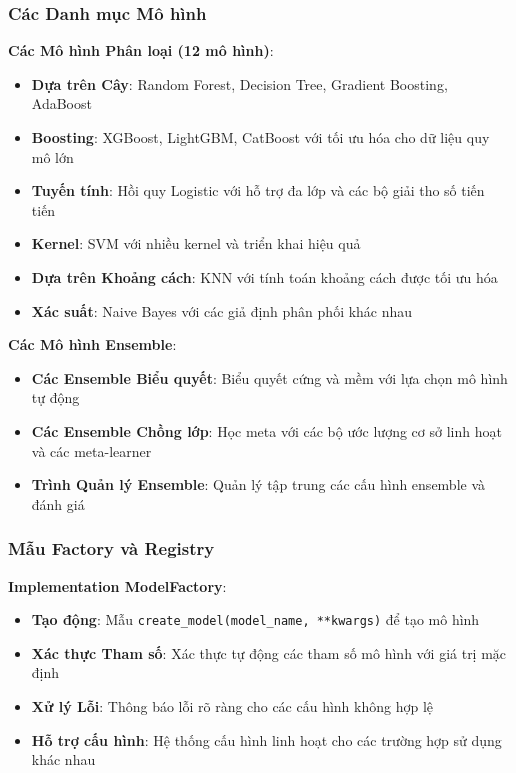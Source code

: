 \subsubsection{Các Danh mục Mô hình}

\textbf{Các Mô hình Phân loại (12 mô hình)}:
\begin{itemize}
    \item \textbf{Dựa trên Cây}: Random Forest, Decision Tree, Gradient Boosting, AdaBoost
    \item \textbf{Boosting}: XGBoost, LightGBM, CatBoost với tối ưu hóa cho dữ liệu quy mô lớn
    \item \textbf{Tuyến tính}: Hồi quy Logistic với hỗ trợ đa lớp và các bộ giải tho số tiến tiến
    \item \textbf{Kernel}: SVM với nhiều kernel và triển khai hiệu quả
    \item \textbf{Dựa trên Khoảng cách}: KNN với tính toán khoảng cách được tối ưu hóa
    \item \textbf{Xác suất}: Naive Bayes với các giả định phân phối khác nhau
\end{itemize}

\textbf{Các Mô hình Ensemble}:
\begin{itemize}
    \item \textbf{Các Ensemble Biểu quyết}: Biểu quyết cứng và mềm với lựa chọn mô hình tự động
    \item \textbf{Các Ensemble Chồng lớp}: Học meta với các bộ ước lượng cơ sở linh hoạt và các meta-learner
    \item \textbf{Trình Quản lý Ensemble}: Quản lý tập trung các cấu hình ensemble và đánh giá
\end{itemize}

\subsubsection{Mẫu Factory và Registry}

\textbf{Implementation ModelFactory}:
        \begin{itemize}
    \item \textbf{Tạo động}: Mẫu \texttt{create\_model(model\_name, **kwargs)} để tạo mô hình
    \item \textbf{Xác thực Tham số}: Xác thực tự động các tham số mô hình với giá trị mặc định
    \item \textbf{Xử lý Lỗi}: Thông báo lỗi rõ ràng cho các cấu hình không hợp lệ
    \item \textbf{Hỗ trợ cấu hình}: Hệ thống cấu hình linh hoạt cho các trường hợp sử dụng khác nhau
        \end{itemize}

